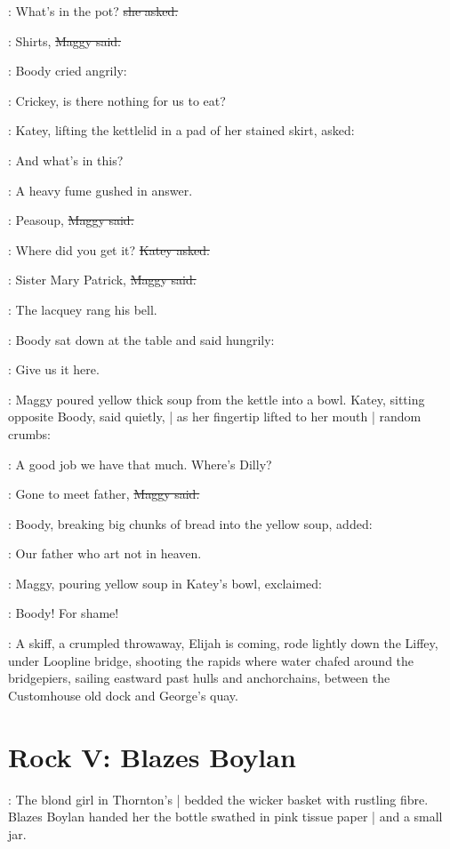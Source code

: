 \katey:
What's in the pot?
\sout{she asked.}

\maggy:
Shirts,
\sout{Maggy said.}

:
Boody cried angrily:

\boody:
Crickey, is there nothing for us to eat?

:
Katey,
lifting the kettlelid in a pad of her stained skirt,
asked:

\katey:
And what's in this?

:
A heavy fume gushed in answer.

\maggy:
Peasoup,
\sout{Maggy said.}

\katey:
Where did you get it?
\sout{Katey asked.}

\maggy:
Sister Mary Patrick,
\sout{Maggy said.}

:
The lacquey rang his bell.


:
Boody sat down at the table and said hungrily:

\boody:
Give us it here.

:
Maggy poured yellow thick soup from the kettle into a bowl.
Katey,
sitting opposite Boody,
said quietly, |
as her fingertip lifted to her mouth |
random crumbs:

\katey:
A good job we have that much.
Where's Dilly?

\maggy:
Gone to meet father,
\sout{Maggy said.}

:
Boody,
breaking big chunks of bread into the yellow soup,
added:

\boody:
Our father who art not in heaven.

:
Maggy,
pouring yellow soup in Katey's bowl,
exclaimed:

\maggy:
Boody!
For shame!

\begin{mdframed}
    :
    A skiff,
    a crumpled throwaway,
    Elijah is coming,
    rode lightly down the Liffey,
    under Loopline bridge,
    shooting the rapids where water chafed around the bridgepiers,
    sailing eastward past hulls and anchorchains,
    between the Customhouse old dock and George's quay.
\end{mdframed}


\section*{Rock V: Blazes Boylan}

:
The blond girl in Thornton's |
bedded the wicker basket with rustling fibre.
Blazes Boylan handed her the bottle swathed in pink tissue paper |
and a small jar.

